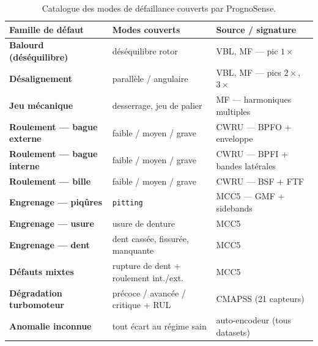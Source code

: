 \begin{table}[h]
\centering\small
\caption{Catalogue des modes de défaillance couverts par PrognoSense.}
\label{tab:fautes}
\begin{tabular}{>{\bfseries}p{3.4cm} p{6.4cm} p{3.6cm}}
\toprule
Famille de défaut & Modes couverts & Source / signature \\
\midrule
Balourd (déséquilibre) & déséquilibre rotor & VBL, MF --- pic $1\times$ \\
Désalignement & parallèle / angulaire & VBL, MF --- pics $2\times$, $3\times$ \\
Jeu mécanique & desserrage, jeu de palier & MF --- harmoniques multiples \\
Roulement --- bague externe & faible / moyen / grave & CWRU --- BPFO + enveloppe \\
Roulement --- bague interne & faible / moyen / grave & CWRU --- BPFI + bandes latérales \\
Roulement --- bille & faible / moyen / grave & CWRU --- BSF + FTF \\
Engrenage --- piqûres & \texttt{pitting} & MCC5 --- GMF + sidebands \\
Engrenage --- usure & usure de denture & MCC5 \\
Engrenage --- dent & dent cassée, fissurée, manquante & MCC5 \\
Défauts mixtes & rupture de dent + roulement int./ext. & MCC5 \\
Dégradation turbomoteur & précoce / avancée / critique + RUL & CMAPSS (21 capteurs) \\
Anomalie inconnue & tout écart au régime sain & auto-encodeur (tous datasets) \\
\bottomrule
\end{tabular}
\end{table}

